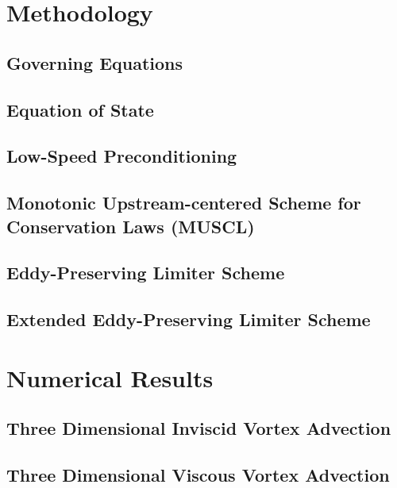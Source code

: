 \documentclass[twocolumn,10pt]{asme2ej}
\begin{document}
\section{Methodology}

\subsection{Governing Equations}


\subsection{Equation of State}


\subsection{Low-Speed Preconditioning}


\subsection{Monotonic Upstream-centered Scheme for Conservation Laws (MUSCL)}


\subsection{Eddy-Preserving Limiter Scheme}


\subsection{Extended Eddy-Preserving Limiter Scheme}

\section{Numerical Results} 

\subsection{Three Dimensional Inviscid Vortex Advection}


\subsection{Three Dimensional Viscous Vortex Advection}

\end{document}
